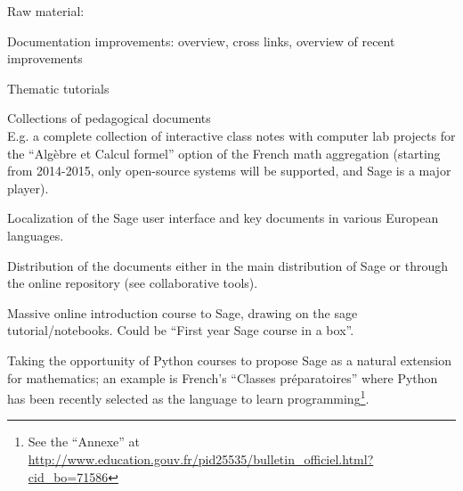 \begin{workpackage}
Raw material:
\begin{compactitem}
\item Documentation improvements: overview, cross links, overview of
  recent improvements
\item Thematic tutorials
\item Collections of pedagogical documents\\
  E.g. a complete collection of interactive class notes with computer
  lab projects for the ``Algèbre et Calcul formel'' option of the
  French math aggregation (starting from 2014-2015, only open-source
  systems will be supported, and Sage is a major player).
\item Localization of the Sage user interface and key documents in
  various European languages.
\item Distribution of the documents either in the main distribution of
  Sage or through the online repository (see collaborative tools).
\item Massive online introduction course to Sage, drawing on the sage tutorial/notebooks.
Could be ``First year Sage course in a box''.
\item Taking the opportunity of Python courses to propose Sage as a natural extension
for mathematics; an example is French's
``Classes pr\'eparatoires''
where Python has been recently selected as the language to learn programming\footnote{See
the ``Annexe'' at
\url{http://www.education.gouv.fr/pid25535/bulletin_officiel.html?cid_bo=71586}}.
\end{compactitem}



\end{workpackage}
